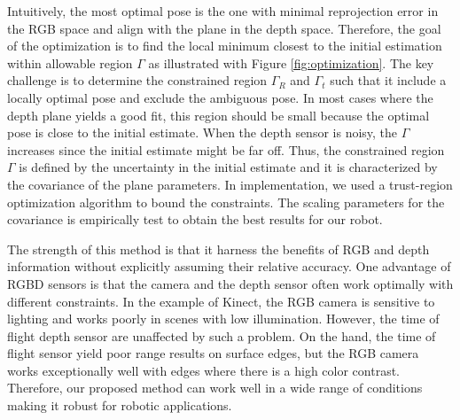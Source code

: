 Intuitively, the most optimal pose is the one with minimal reprojection error in the RGB space and align with the plane in the depth space. Therefore, the goal of the optimization is to find the local minimum closest to the initial estimation within allowable region $\Gamma$ as illustrated with Figure \ref{fig:optimization}. The key challenge is to determine the constrained region $\Gamma_R$ and $\Gamma_t$ such that it include a locally optimal pose and exclude the ambiguous pose. In most cases where the depth plane yields a good fit, this region should be small because the optimal pose is close to the initial estimate. When the depth sensor is noisy, the $\Gamma$ increases since the initial estimate might be far off. Thus, the constrained region $\Gamma$ is defined by the uncertainty in the initial estimate and it is characterized by the covariance of the plane parameters. In implementation, we used a trust-region optimization algorithm to bound the constraints. The scaling parameters for the covariance is empirically test to obtain the best results for our robot. 

The strength of this method is that it harness the benefits of RGB and depth information without explicitly assuming their relative accuracy. One advantage of RGBD sensors is that the camera and the depth sensor often work optimally with different constraints. In the example of Kinect, the RGB camera is sensitive to lighting and works poorly in scenes with low illumination. However, the time of flight depth sensor are unaffected by such a problem. On the hand, the time of flight sensor yield poor range results on surface edges, but the RGB camera works exceptionally well with edges where there is a high color contrast. Therefore, our proposed method can work well in a wide range of conditions making it robust for robotic applications. 